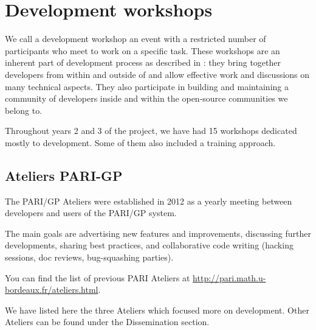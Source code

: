 \documentclass{deliverablereport}
\author{Viviane Pons et al.}
\begin{document}
\maketitle
\githubissuedescription
\newpage
\tableofcontents


\section{Development workshops}

We call a development workshop an event with a restricted number of participants
who meet to work on a specific task. These workshops are an inherent part
of \ODK development process as described in :
 they bring together
developers from within and outside of \ODK and allow effective work
and discussions on many technical aspects. They also participate in building
and maintaining a community of developers inside \ODK and within the
open-source communities we belong to.

Throughout years 2 and 3 of the project, we have had 15 workshops dedicated mostly
to development. Some of them also included a training approach. 

\subsection{Ateliers PARI-GP}

The PARI/GP Ateliers were established in 2012 as a yearly meeting
between developers and users of the PARI/GP system.

The main goals are advertising new features and improvements,
discussing further developments, sharing best practices, and collaborative
code writing (hacking sessions, doc reviews, bug-squashing parties).

You can find the list of previous PARI Ateliers at
\url{http://pari.math.u-bordeaux.fr/ateliers.html}.

We have listed here the three Ateliers which focused more on development. 
Other Ateliers can be found under the Dissemination section.






\end{document}
